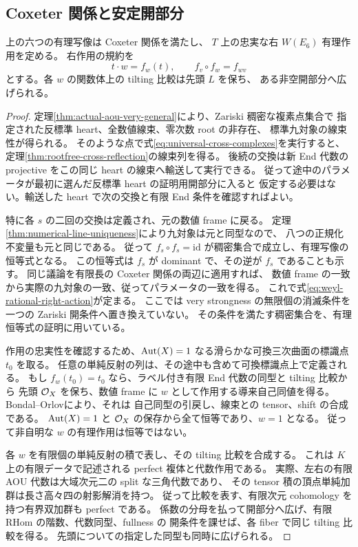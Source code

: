 \subsection{Coxeter 関係と安定開部分}

\begin{theorem}
\label{thm:weyl-birational-action}
上の六つの有理写像は Coxeter 関係を満たし、
$T$ 上の忠実な右 $W(E_6)$ 有理作用を定める。
右作用の規約を
\begin{equation}\label{eq:weyl-rational-right-action}
 t\cdot w=f_w(t),\qquad f_v\circ f_w=f_{wv}
\end{equation}
とする。各 $w$ の関数体上の tilting 比較は先頭 $L$ を保ち、
ある非空開部分へ広げられる。
\end{theorem}
\begin{proof}
定理\ref{thm:actual-aou-very-general}により、Zariski 稠密な複素点集合で
指定された反標準 heart、全数値線束、零次数 root の非存在、
標準九対象の線束性が得られる。
そのような点で式\eqref{eq:universal-cross-complexes}を実行すると、
定理\ref{thm:rootfree-cross-reflection}の線束列を得る。
後続の交換は新 End 代数の projective をこの同じ heart の線束へ輸送して実行できる。
従って途中のパラメータが最初に選んだ反標準 heart の証明用開部分に入ると
仮定する必要はない。輸送した heart で次の交換と有限 End 条件を確認すればよい。

特に各 $s$ の二回の交換は定義され、元の数値 frame に戻る。
定理\ref{thm:numerical-line-uniqueness}により九対象は元と同型なので、
八つの正規化不変量も元と同じである。
従って $f_s\circ f_s=\mathrm{id}$ が稠密集合で成立し、有理写像の恒等式となる。
この恒等式は $f_s$ が dominant で、その逆が $f_s$ であることも示す。
同じ議論を有限長の Coxeter 関係の両辺に適用すれば、
数値 frame の一致から実際の九対象の一致、従ってパラメータの一致を得る。
これで式\eqref{eq:weyl-rational-right-action}が定まる。
ここでは very strongness の無限個の消滅条件を一つの Zariski 開条件へ置き換えていない。
その条件を満たす稠密集合を、有理恒等式の証明に用いている。

作用の忠実性を確認するため、$\operatorname{Aut}(X)=1$ なる滑らかな可換三次曲面の標識点 $t_0$ を取る。
任意の単純反射の列は、その途中も含めて可換標識点上で定義される。
もし $f_w(t_0)=t_0$ なら、ラベル付き有限 End 代数の同型と tilting 比較から
先頭 $\mathcal O_X$ を保ち、数値 frame に $w$ として作用する導来自己同値を得る。
Bondal--Orlov\cite[Theorem 3.1]{BO}により、それは
自己同型の引戻し、線束との tensor、shift の合成である。
$\operatorname{Aut}(X)=1$ と $\mathcal O_X$ の保存から全て恒等であり、$w=1$ となる。
従って非自明な $w$ の有理作用は恒等ではない。

各 $w$ を有限個の単純反射の積で表し、その tilting 比較を合成する。
これは $K$ 上の有限データで記述される perfect 複体と代数作用である。
実際、左右の有限 AOU 代数は大域次元二の split な三角代数であり、
その tensor 積の頂点単純加群は長さ高々四の射影解消を持つ。
従って比較を表す、有限次元 cohomology を持つ有界双加群も perfect である。
係数の分母を払って開部分へ広げ、有限 RHom の階数、代数同型、fullness の
開条件を課せば、各 fiber で同じ tilting 比較を得る。
先頭についての指定した同型も同時に広げられる。
\end{proof}

